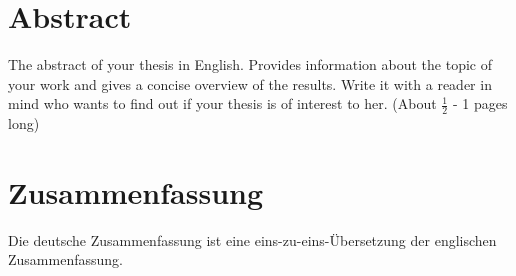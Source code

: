 \chapter*{Abstract}

The abstract of your thesis in English. Provides information about the topic of your work and gives a concise overview of the results. Write it with a reader in mind who wants to find out if your thesis is of interest to her. (About $\frac{1}{2}$ - 1 pages long)


\chapter*{Zusammenfassung}

Die deutsche Zusammenfassung ist eine eins-zu-eins-Übersetzung der
englischen Zusammenfassung.